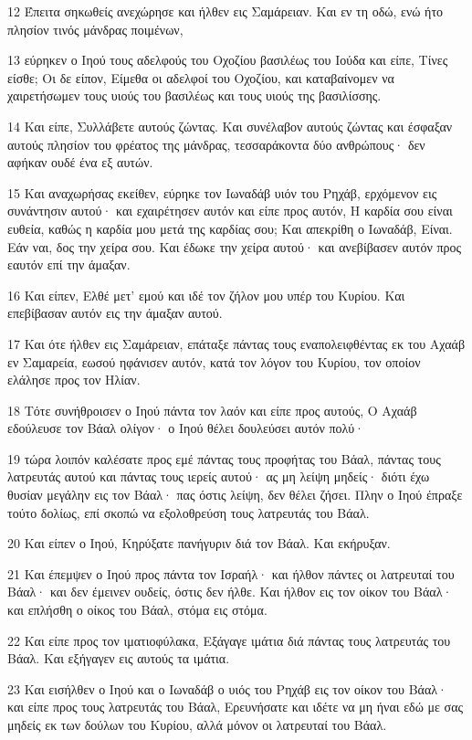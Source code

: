 \par 12 Έπειτα σηκωθείς ανεχώρησε και ήλθεν εις Σαμάρειαν. Και εν τη οδώ, ενώ ήτο πλησίον τινός μάνδρας ποιμένων,
\par 13 εύρηκεν ο Ιηού τους αδελφούς του Οχοζίου βασιλέως του Ιούδα και είπε, Τίνες είσθε; Οι δε είπον, Είμεθα οι αδελφοί του Οχοζίου, και καταβαίνομεν να χαιρετήσωμεν τους υιούς του βασιλέως και τους υιούς της βασιλίσσης.
\par 14 Και είπε, Συλλάβετε αυτούς ζώντας. Και συνέλαβον αυτούς ζώντας και έσφαξαν αυτούς πλησίον του φρέατος της μάνδρας, τεσσαράκοντα δύο ανθρώπους· δεν αφήκαν ουδέ ένα εξ αυτών.
\par 15 Και αναχωρήσας εκείθεν, εύρηκε τον Ιωναδάβ υιόν του Ρηχάβ, ερχόμενον εις συνάντησιν αυτού· και εχαιρέτησεν αυτόν και είπε προς αυτόν, Η καρδία σου είναι ευθεία, καθώς η καρδία μου μετά της καρδίας σου; Και απεκρίθη ο Ιωναδάβ, Είναι. Εάν ναι, δος την χείρα σου. Και έδωκε την χείρα αυτού· και ανεβίβασεν αυτόν προς εαυτόν επί την άμαξαν.
\par 16 Και είπεν, Ελθέ μετ' εμού και ιδέ τον ζήλον μου υπέρ του Κυρίου. Και επεβίβασαν αυτόν εις την άμαξαν αυτού.
\par 17 Και ότε ήλθεν εις Σαμάρειαν, επάταξε πάντας τους εναπολειφθέντας εκ του Αχαάβ εν Σαμαρεία, εωσού ηφάνισεν αυτόν, κατά τον λόγον του Κυρίου, τον οποίον ελάλησε προς τον Ηλίαν.
\par 18 Τότε συνήθροισεν ο Ιηού πάντα τον λαόν και είπε προς αυτούς, Ο Αχαάβ εδούλευσε τον Βάαλ ολίγον· ο Ιηού θέλει δουλεύσει αυτόν πολύ·
\par 19 τώρα λοιπόν καλέσατε προς εμέ πάντας τους προφήτας του Βάαλ, πάντας τους λατρευτάς αυτού και πάντας τους ιερείς αυτού· ας μη λείψη μηδείς· διότι έχω θυσίαν μεγάλην εις τον Βάαλ· πας όστις λείψη, δεν θέλει ζήσει. Πλην ο Ιηού έπραξε τούτο δολίως, επί σκοπώ να εξολοθρεύση τους λατρευτάς του Βάαλ.
\par 20 Και είπεν ο Ιηού, Κηρύξατε πανήγυριν διά τον Βάαλ. Και εκήρυξαν.
\par 21 Και έπεμψεν ο Ιηού προς πάντα τον Ισραήλ· και ήλθον πάντες οι λατρευταί του Βάαλ· και δεν έμεινεν ουδείς, όστις δεν ήλθε. Και ήλθον εις τον οίκον του Βάαλ· και επλήσθη ο οίκος του Βάαλ, στόμα εις στόμα.
\par 22 Και είπε προς τον ιματιοφύλακα, Εξάγαγε ιμάτια διά πάντας τους λατρευτάς του Βάαλ. Και εξήγαγεν εις αυτούς τα ιμάτια.
\par 23 Και εισήλθεν ο Ιηού και ο Ιωναδάβ ο υιός του Ρηχάβ εις τον οίκον του Βάαλ· και είπε προς τους λατρευτάς του Βάαλ, Ερευνήσατε και ιδέτε να μη ήναι εδώ με σας μηδείς εκ των δούλων του Κυρίου, αλλά μόνον οι λατρευταί του Βάαλ.
